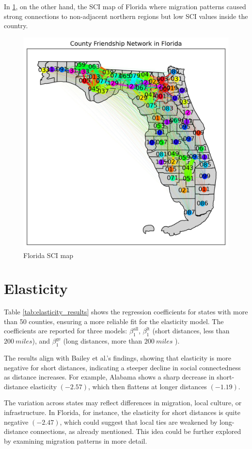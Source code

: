 In \ref{fig:SCI-Flo}, on the other hand, the SCI map of Florida where migration patterns caused strong connections to non-adjacent northern regions but low SCI values inside the country.

\begin{figure}[ht]
    \centering
    \includegraphics[width=0.7\linewidth]{images/network_Florida.jpg}
    \caption{Florida SCI map}
    \label{fig:SCI-Flo}
\end{figure}

\section{Elasticity}

Table \ref{tab:elasticity_results} shows the regression coefficients for states with more than 50 counties, ensuring a more reliable fit for the elasticity model. The coefficients are reported for three models: $\beta_1^{\text{all}}$, $\beta_1^{\text{lt}}$ (short distances, less than $200 \ miles$), and $\beta_1^{\text{ge}}$ (long distances, more than $200 \ miles$ ).

The results align with Bailey et al.'s findings, showing that elasticity is more negative for short distances, indicating a steeper decline in social connectedness as distance increases. For example, Alabama shows a sharp decrease in short-distance elasticity $(-2.57)$, which then flattens at longer distances $(-1.19)$.

The variation across states may reflect differences in migration, local culture, or infrastructure. In Florida, for instance, the elasticity for short distances is quite negative $(-2.47)$, which could suggest that local ties are weakened by long-distance connections, as already mentioned. This idea could be further explored by examining migration patterns in more detail.

